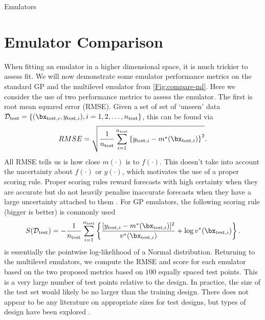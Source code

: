 \begin{chapter}{Emulators \label{Ch:Emulators}}
\section{Emulator Comparison}
When fitting an emulator in a higher dimensional space, it is much trickier to assess fit. We will now demonstrate some emulator performance metrics on the standard GP and the multilevel emulator from \cref{Fig:compare-ml}. Here we consider the use of two performance metrics to assess the emulator. The first is root mean squared error (RMSE). Given a set of set of `unseen' data $\mathcal{D}_{\text{test}} = \{ (\bx_{\text{test},i}, y_{\text{test},i}), i = 1, 2, \ldots, n_{\text{test}} \} $, this can be found via
\begin{equation}
  RMSE = \sqrt{ \frac{1}{n_\text{test}}  \sum_{i = 1}^{n_\text{test}} \left\{ y_{\text{test},i} - m^*( \bx_{\text{test},i} )  \right\}^2 }. \label{Eq:rmse}
\end{equation}
All RMSE tells us is how close $m(\cdot)$ is to $f(\cdot)$. This doesn't take into account the uncertainty about $f(\cdot)$ or $y(\cdot)$, which motivates the use of a proper scoring rule. Proper scoring rules reward forecasts with high certainty when they are accurate but do not heavily penalise inaccurate forecasts when they have a large uncertainty attached to them \citep{Gneiting2007}. For GP emulators, the following scoring rule (bigger is better) is commonly used \citep{Binois2018,Jackson2019}
\begin{equation}
  S(\mathcal{D}_\text{test}) = -\frac{1}{n_{\text{test}}}\sum_{i = 1}^{n_\text{test}}\left\{ \frac{[y_{\text{test},i} - m^*(\bx_{\text{test},i} ) ]^2}{v^*(\bx_{\text{test},i})} + \log v^*(\bx_{\text{test},i})\right\}.\label{Eq:scoring-rule}
\end{equation}
 is essentially the pointwise log-likelihood of a Normal distribution.
Returning to the multilevel emulators, we compute the RMSE and score for each emulator based on the two proposed metrics based on $100$ equally spaced test points. This is a very large number of test points relative to the design. In practice, the size of the test set would likely be no larger than the training design. There does not appear to be any literature on appropriate sizes for test designs, but types of design have been explored \citep{Challenor2013}.


\end{chapter}
